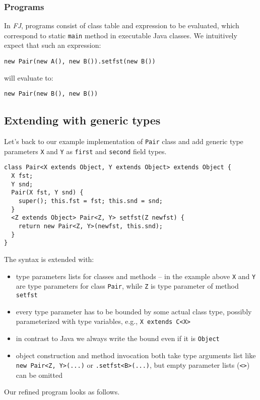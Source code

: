 \documentclass{article}[12pt]
\begin{document}
\subsubsection{Programs}

In \emph{FJ}, programs consist of class table and expression to be
evaluated, which correspond to static \texttt{main} method in
executable Java classes. We intuitively expect that such an
expression:

\begin{verbatim}
new Pair(new A(), new B()).setfst(new B())
\end{verbatim}
will evaluate to:
\begin{verbatim}
new Pair(new B(), new B())
\end{verbatim}


\subsection{Extending with generic types}

Let's back to our example implementation of \texttt{Pair} class and
add generic type parameters \texttt{X} and \texttt{Y} as
\texttt{first} and \texttt{second} field types.

\begin{verbatim}
class Pair<X extends Object, Y extends Object> extends Object {
  X fst;
  Y snd;
  Pair(X fst, Y snd) {
    super(); this.fst = fst; this.snd = snd;
  }
  <Z extends Object> Pair<Z, Y> setfst(Z newfst) {
    return new Pair<Z, Y>(newfst, this.snd);
  }
}
\end{verbatim}
The syntax is extended with:

\begin{itemize}
\item type parameters lists for classes and methods -- in the example
  above \texttt{X} and \texttt{Y} are type parameters for class
  \texttt{Pair}, while \texttt{Z} is type parameter of method
  \texttt{setfst}
\item every type parameter has to be bounded by some actual class
  type, possibly parameterized with type variables, e.g.,
  \texttt{X extends C<X>}
\item in contrast to Java we always write the bound even if it
  is \texttt{Object}
\item object construction and method invocation both take
  type arguments list like \texttt{new Pair<Z, Y>(...)} or
  \texttt{.setfst<B>(...)}, but empty parameter lists (\texttt{<>})
  can be omitted
\end{itemize}
Our refined program looks as follows.
\end{document}
